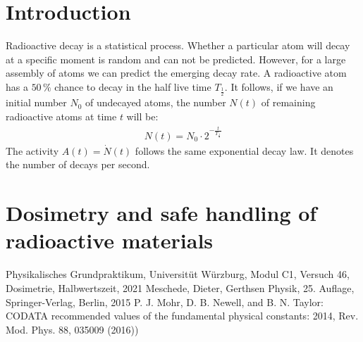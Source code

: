\documentclass[a4paper,10pt,twocolumn]{article}
\newcommand{\Thalf}{T_{\mathrm{\frac{1}{2}}}}
\begin{document}
    \section{Introduction}
    
    Radioactive decay is a statistical process.
    Whether a particular atom will decay at a specific moment is random and can not be predicted.
    However, for a large assembly of atoms we can predict the emerging decay rate.
    A radioactive atom has a $50\,\%$ chance to decay in the half live time $\Thalf$.
    It follows, if we have an initial number $N_0$ of undecayed atoms, the number $N(t)$ of remaining radioactive atoms
    at time $t$ will be:
    \begin{align}
        \label{eq:decayRate}
        N(t) = N_0 \cdot 2^{-\frac{t}{\Thalf}}
    \end{align}
    The activity $A(t) = \dot{N}(t)$ follows the same exponential decay law.
    It denotes the number of decays per second.
    
    \section{Dosimetry and safe handling of radioactive materials}
    
    
    \begin{thebibliography}{}    %
         Physikalisches Grundpraktikum, Universitüt Würzburg, Modul C1, Versuch 46, Dosimetrie, Halbwertszeit, 2021
         Meschede, Dieter, Gerthsen Physik, 25. Auflage, Springer-Verlag, Berlin, 2015
         P. J. Mohr, D. B. Newell, and B. N. Taylor: \grqq CODATA
        recommended values of the fundamental physical constants: 2014\grqq , Rev. Mod. Phys.
        88, 035009 (2016))
    \end{thebibliography}
    
\end{document}
